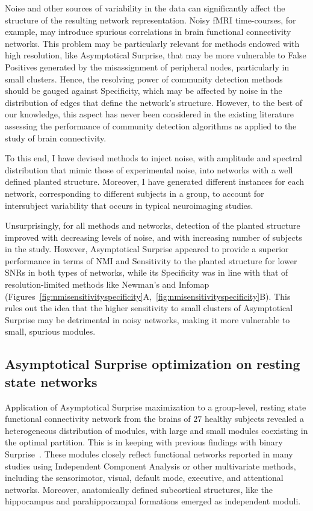 Noise and other sources of variability in the data can significantly affect the structure of the resulting network representation.
Noisy fMRI time-courses, for example, may introduce spurious correlations in brain functional connectivity networks.
This problem may be particularly relevant for methods endowed with high resolution, like Asymptotical Surprise, that may be more vulnerable to False Positives generated by the misassignment of peripheral nodes, particularly in small clusters.
Hence, the resolving power of community detection methods should be gauged against Specificity, which may be affected by noise in the distribution of edges that define the network's structure.
However, to the best of our knowledge, this aspect has never been considered in the existing literature assessing the performance of community detection algorithms as applied to the study of brain connectivity.

To this end, I have devised methods to inject noise, with amplitude and spectral distribution that mimic those of experimental noise, into networks with a well defined planted structure.
Moreover, I have generated different instances for each network, corresponding to different subjects in a group, to account for intersubject variability that occurs in typical neuroimaging studies.

Unsurprisingly, for all methods and networks, detection of the planted structure improved with decreasing levels of noise, and with increasing number of subjects in the study.
However, Asymptotical Surprise appeared to provide a superior performance in terms of NMI and Sensitivity to the planted structure for lower SNRs in both types of networks, while its Specificity was in line with that of resolution-limited methods like Newman's and Infomap (Figures~\ref{fig:nmisensitivityspecificity}A,~\ref{fig:nmisensitivityspecificity}B).
This rules out the idea that the higher sensitivity to small clusters of Asymptotical Surprise may be detrimental in noisy networks, making it more vulnerable to small, spurious modules.

\subsection{Asymptotical Surprise optimization on resting state networks}
Application of Asymptotical Surprise maximization to a group-level, resting state functional connectivity network from the brains of $27$ healthy subjects revealed a heterogeneous distribution of modules, with large and small modules coexisting in the optimal partition.
This is in keeping with previous findings with binary Surprise~\cite{nicolini2016}.
These modules closely reflect functional networks reported in many studies using Independent Component Analysis or other multivariate methods, including the sensorimotor, visual, default mode, executive, and attentional networks.
Moreover, anatomically defined subcortical structures, like the hippocampus and parahippocampal formations emerged as independent moduli.

